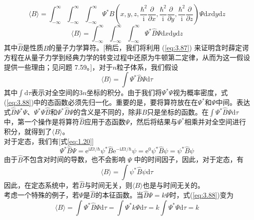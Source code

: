 	\begin{equation*}
		\langle B \rangle = \int_{-\infty}^{\infty}\int_{-\infty}^{\infty}\int_{-\infty}^{\infty}\Psi^{\ast}B\left(x,y,z,\frac{\hbar^2}{\mathrm{i}}\frac{\partial}{\partial x},\frac{\hbar^2}{\mathrm{i}}\frac{\partial}{\partial y},\frac{\hbar^2}{\mathrm{i}}\frac{\partial}{\partial z}\right)\Psi\mathrm{d}x\mathrm{d}y\mathrm{d}z
	\end{equation*}
	\begin{equation}
		\langle B \rangle = \int_{-\infty}^{\infty}\int_{-\infty}^{\infty}\int_{-\infty}^{\infty}\Psi^{\ast}\hat{B}\Psi\mathrm{d}x\mathrm{d}y\mathrm{d}z
		\label{eq:3.87}
	\end{equation}
	其中$\hat{B}$是性质$B$的量子力学算符。[稍后，我们将利用 (\ref{eq:3.87}) 来证明含时薛定谔方程在从量子力学到经典力学的转变过程中还原为牛顿第二定律，从而为这一假设提供一些理由；见问题 7.59。]，对于$n$粒子体系，我们假设
	\begin{equation}
		\boxed{
			\langle B \rangle = \int \Psi^{\ast}\hat{B}\Psi\mathrm{d}\tau
		}
		\label{eq:3.88}
	\end{equation}
	其中$\int\mathrm{d}\tau$表示对全空间的$3n$坐标的积分。由于我们将$\Psi^{\ast}\Psi$视为概率密度，式(\ref{eq:3.88})中的态函数必须先归一化。重要的是，要将算符放在在$\Psi^{\ast}$和$\Psi$中间。表达式$\hat{B}\Psi^{\ast}\Psi$、$\Psi^{\ast}\Psi\hat{B}$和$\Psi^{\ast}\hat{B}\Psi$的含义是不同的，除非$B$只是坐标的函数。在$\int\Psi^{\ast}\hat{B}\Psi\mathrm{d}\tau$中，第一个操作是将算符$\hat{B}$应用于态函数$\Psi$，然后将结果与$\Psi^{\ast}$相乘并对全空间进行积分，就得到了$\langle B \rangle$。\\
	\indent 对于定态，我们有[式\ref{eq:1.20}]
	\begin{equation*}
		\Psi^{\ast}\hat{B}\Psi = \mathrm{e}^{\mathrm{i}Et/\hbar}\psi^{\ast}\hat{B}\mathrm{e}^{-\mathrm{i}Et/\hbar}\psi = \mathrm{e}^{0}\psi^{\ast}\hat{B}\psi = \psi^{\ast}\hat{B}\psi
	\end{equation*}
	由于$\hat{B}$不包含对时间的导数，也不会影响 $\Psi$ 中的时间因子，因此，对于定态，有
	\begin{equation}
		\langle B \rangle = \int \psi^{\ast}\hat{B}\psi\mathrm{d}\tau
		\label{eq:3.89}
	\end{equation}
	因此，在定态系统中，若$\hat{B}$与时间无关，则$\langle B \rangle$也是与时间无关的。\\
	\indent 考虑一个特殊的例子，若$\Psi$是$\hat{B}$的本征函数。当$\hat{B}\Psi = k\Psi$时，式(\ref{eq:3.88})变为
	\begin{equation*}
		\langle B \rangle = \int \Psi^{\ast}\hat{B}\Psi\mathrm{d}\tau = \int \Psi^{\ast}k\Psi\mathrm{d}\tau = k \int \Psi^{\ast}\Psi\mathrm{d}\tau = k
	\end{equation*}
